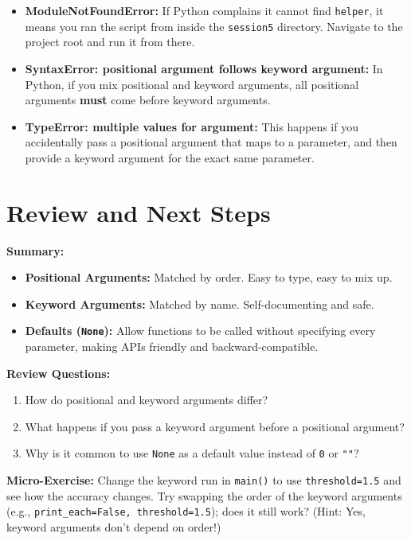 \begin{tcolorbox}[title=Common Mistakes \& Errors]
\begin{itemize}
    \item \textbf{ModuleNotFoundError:} If Python complains it cannot find \texttt{helper}, it means you ran the script from inside the \texttt{session5} directory. Navigate to the project root and run it from there.
    \item \textbf{SyntaxError: positional argument follows keyword argument:} In Python, if you mix positional and keyword arguments, all positional arguments \textbf{must} come before keyword arguments.
    \item \textbf{TypeError: multiple values for argument:} This happens if you accidentally pass a positional argument that maps to a parameter, and then provide a keyword argument for the exact same parameter.
\end{itemize}
\end{tcolorbox}

\section{Review and Next Steps}

\textbf{Summary:}
\begin{itemize}
    \item \textbf{Positional Arguments:} Matched by order. Easy to type, easy to mix up.
    \item \textbf{Keyword Arguments:} Matched by name. Self-documenting and safe.
    \item \textbf{Defaults (\texttt{None}):} Allow functions to be called without specifying every parameter, making APIs friendly and backward-compatible.
\end{itemize}

\textbf{Review Questions:}
\begin{enumerate}
    \item How do positional and keyword arguments differ?
    \item What happens if you pass a keyword argument before a positional argument?
    \item Why is it common to use \texttt{None} as a default value instead of \texttt{0} or \texttt{""}?
\end{enumerate}

\textbf{Micro-Exercise:} Change the keyword run in \texttt{main()} to use \texttt{threshold=1.5} and see how the accuracy changes. Try swapping the order of the keyword arguments (e.g., \texttt{print\_each=False, threshold=1.5}); does it still work? (Hint: Yes, keyword arguments don't depend on order!)

